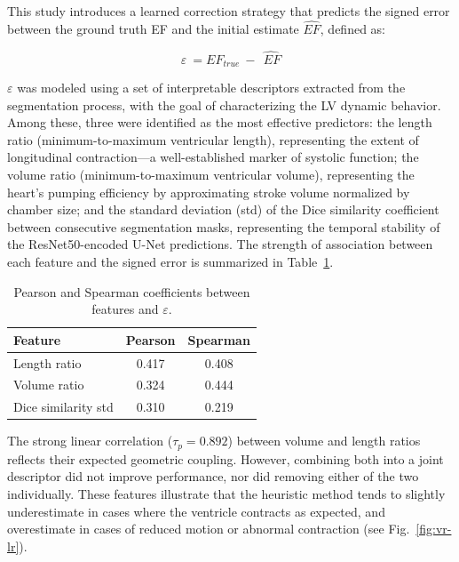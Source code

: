 \documentclass[runningheads]{llncs}
\begin{document}
This study introduces a learned correction strategy that predicts the signed error between the ground truth EF and the initial estimate $\widehat{EF}$, defined as:

\begin{equation}
    \varepsilon\ ={EF}_{true}\ -\ \widehat{\ EF}
\end{equation}

$\varepsilon$ was modeled using a set of interpretable descriptors extracted from the segmentation process, with the goal of characterizing the LV dynamic behavior. Among these, three were identified as the most effective predictors: the length ratio (minimum-to-maximum ventricular length), representing the extent of longitudinal contraction—a well-established marker of systolic function; the volume ratio (minimum-to-maximum ventricular volume), representing the heart’s pumping efficiency by approximating stroke volume normalized by chamber size; and the standard deviation (std) of the Dice similarity coefficient between consecutive segmentation masks, representing the temporal stability of the ResNet50-encoded U-Net predictions. The strength of association between each feature and the signed error is summarized in Table~\ref{tab:correlation-features}.

\begin{table}[ht]
\centering
\caption{Pearson and Spearman coefficients between features and $\varepsilon$.}
\label{tab:correlation-features}
\begin{tabular}{|l|c|c|}
\hline
\textbf{Feature}              & \textbf{Pearson} & \textbf{Spearman} \\
\hline
Length ratio                 & 0.417            & 0.408             \\
Volume ratio                 & 0.324            & 0.444             \\
Dice similarity std          & 0.310            & 0.219             \\
\hline
\end{tabular}
\end{table}


The strong linear correlation ($\tau_p = 0.892$) between volume and length ratios reflects their expected geometric coupling. However, combining both into a joint descriptor did not improve performance, nor did removing either of the two individually. These features illustrate that the heuristic method tends to slightly underestimate in cases where the ventricle contracts as expected, and overestimate in cases of reduced motion or abnormal contraction (see Fig.~\ref{fig:vr-lr}).
\end{document}
